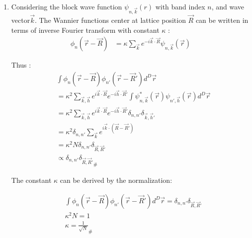\documentclass[notitlepage]{revtex4-1}
\begin{document}
\begin{CJK}{UTF8}{bsmi}
\begin{enumerate}
	\item Considering the block wave function $\psi_{n,\vec{k}}(r)$ with band index $n$, and wave vector$\vec{k}$. The Wannier functions center at lattice position $\vec{R}$ can be written in terms of inverse Fourier transform with constant $\kappa$ :
	\begin{equation}
		\begin{split}
			\phi_n(\vec{r} - \vec{R}) &= \kappa \sum_{\vec{k}} e^{-i \vec{k} \cdot \vec{R}} \psi_{n,\vec{k}}(\vec{r}) 
		\end{split}
	\end{equation}   
	
	Thus :
	\begin{equation}
		\begin{split}
			& \int \phi_n(\vec{r} - \vec{R})\phi_{n'}(\vec{r} - \vec{R}')  d^{D}\vec{r} \\
			&= \kappa^2 \sum_{\vec{k},\vec{h}} e^{i \vec{k} \cdot \vec{R}} e^{-i \vec{h} \cdot \vec{R}'} \int \psi^{*}_{n,\vec{k}}(\vec{r})\psi_{n',\vec{h}}(\vec{r}) d^{D}\vec{r} \\
			&= \kappa^2 \sum_{\vec{k},\vec{h}} e^{i \vec{k} \cdot \vec{R}} e^{-i \vec{h} \cdot \vec{R}'} \delta_{n,n'} \delta_{\vec{k},\vec{h}'} \\
			&= \kappa^2 \delta_{n,n'} \sum_{\vec{k}} e^{i \vec{k} \cdot (\vec{R}-\vec{R}')} \\
			&= \kappa^2 N \delta_{n,n'} \delta_{\vec{R},\vec{R}'} \\
			&\propto \delta_{n,n'} {\delta_{\vec{R},\vec{R}'}}_{\#}
		\end{split}
	\end{equation} 	
	
	The constant $\kappa$ can be derived by the normalization:
	
	\begin{align*}
	 &\int \phi_n(\vec{r} - \vec{R})\phi_{n'}(\vec{r} - \vec{R}') d^{D}\vec{r} = \delta_{n,n'} \delta_{\vec{R},\vec{R}'} \\
	 &\kappa^2 N = 1 \\
	 &\kappa = \frac{1}{\sqrt{N}}_{\#}
	\end{align*}


\end{enumerate}
\end{CJK}
\end{document}
